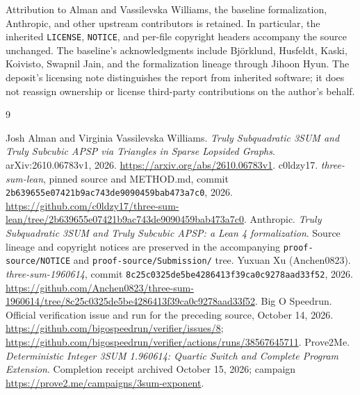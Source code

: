 \documentclass[11pt,a4paper]{article}
\newcommand{\code}[1]{\texttt{#1}}
\begin{document}
Attribution to Alman and Vassilevska Williams, the baseline formalization,
Anthropic, and other upstream contributors is retained. In particular,
the inherited \code{LICENSE}, \code{NOTICE}, and per-file copyright
headers accompany the source unchanged. The baseline's acknowledgments
include Bj\"orklund, Husfeldt, Kaski, Koivisto, Swapnil Jain, and the
formalization lineage through Jihoon Hyun. The deposit's licensing note
distinguishes the report from inherited software; it does not reassign
ownership or license third-party contributions on the author's behalf.

\begin{thebibliography}{9}\raggedright
{} Josh Alman and Virginia Vassilevska Williams.
\emph{Truly Subquadratic 3SUM and Truly Subcubic APSP via Triangles in Sparse
Lopsided Graphs}. arXiv:2610.06783v1, 2026.
\url{https://arxiv.org/abs/2610.06783v1}.
 c0ldzy17. \emph{three-sum-lean}, pinned source and METHOD.md,
commit \code{2b639655e07421b9ac743de9090459bab473a7c0}, 2026.
\url{https://github.com/c0ldzy17/three-sum-lean/tree/2b639655e07421b9ac743de9090459bab473a7c0}.
 Anthropic. \emph{Truly Subquadratic 3SUM and Truly
Subcubic APSP: a Lean 4 formalization}. Source lineage and copyright
notices are preserved in the accompanying \code{proof-source/NOTICE}
and \code{proof-source/Submission/} tree.
 Yuxuan Xu (Anchen0823).
\emph{three-sum-1960614}, commit
\code{8c25c0325de5be4286413f39ca0c9278aad33f52}, 2026.
\url{https://github.com/Anchen0823/three-sum-1960614/tree/8c25c0325de5be4286413f39ca0c9278aad33f52}.
 Big O Speedrun. Official verification issue and run
for the preceding source, October 14, 2026.
\url{https://github.com/bigospeedrun/verifier/issues/8};
\url{https://github.com/bigospeedrun/verifier/actions/runs/38567645711}.
 Prove2Me. \emph{Deterministic Integer 3SUM 1.960614:
Quartic Switch and Complete Program Extension}. Completion receipt
archived October 15, 2026; campaign
\url{https://prove2.me/campaigns/3sum-exponent}.
\end{thebibliography}
\end{document}
